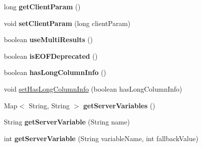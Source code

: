 \begin{DoxyCompactItemize}
long {\bfseries get\+Client\+Param} ()
\item 
\mbox{\label{interfacecom_1_1mysql_1_1cj_1_1protocol_1_1_server_session_a25a797b7b770b843dfad239426ca0621}} 
void {\bfseries set\+Client\+Param} (long client\+Param)
\item 
\mbox{\label{interfacecom_1_1mysql_1_1cj_1_1protocol_1_1_server_session_a7d92f74e5fe2cd93115d904f136b090b}} 
boolean {\bfseries use\+Multi\+Results} ()
\item 
\mbox{\label{interfacecom_1_1mysql_1_1cj_1_1protocol_1_1_server_session_ac41728a86890f318604684f6d8e36635}} 
boolean {\bfseries is\+E\+O\+F\+Deprecated} ()
\item 
\mbox{\label{interfacecom_1_1mysql_1_1cj_1_1protocol_1_1_server_session_a7b542c64c25cf2ebbc4c5709dd6bad80}} 
boolean {\bfseries has\+Long\+Column\+Info} ()
\item 
void \mbox{\hyperlink{interfacecom_1_1mysql_1_1cj_1_1protocol_1_1_server_session_a004d9939fa7471ce08e0b404363642fc}{set\+Has\+Long\+Column\+Info}} (boolean has\+Long\+Column\+Info)
\item 
\mbox{\label{interfacecom_1_1mysql_1_1cj_1_1protocol_1_1_server_session_a0bd7485d9c76e0183247def27942a209}} 
Map$<$ String, String $>$ {\bfseries get\+Server\+Variables} ()
\item 
\mbox{\label{interfacecom_1_1mysql_1_1cj_1_1protocol_1_1_server_session_aadfc93f89a87bfacef5c66a4033e3bcb}} 
String {\bfseries get\+Server\+Variable} (String name)
\item 
\mbox{\label{interfacecom_1_1mysql_1_1cj_1_1protocol_1_1_server_session_afeb21bb0efebb37bf03081dc2febfa6b}} 
int {\bfseries get\+Server\+Variable} (String variable\+Name, int fallback\+Value)
\item 
\mbox{\label{interfacecom_1_1mysql_1_1cj_1_1protocol_1_1_server_session_a47e9a273ef6de1e09dbacada62650998}} 

\end{DoxyCompactItemize}
